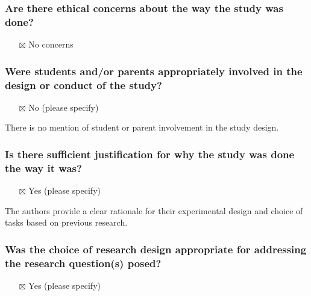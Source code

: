 \documentclass[
  doc, a4paper]{apa7}
\providecommand{\tightlist}{%
  \setlength{\itemsep}{0pt}\setlength{\parskip}{0pt}}
\begin{document}
\subsubsection{Are there ethical concerns about the way the study was done?}\label{are-there-ethical-concerns-about-the-way-the-study-was-done}

\begin{itemize}
\tightlist
\item[$\boxtimes$]
  No concerns
\end{itemize}

\subsubsection{Were students and/or parents appropriately involved in the design or conduct of the study?}\label{were-students-andor-parents-appropriately-involved-in-the-design-or-conduct-of-the-study}

\begin{itemize}
\tightlist
\item[$\boxtimes$]
  No (please specify)
\end{itemize}

There is no mention of student or parent involvement in the study design.

\subsubsection{Is there sufficient justification for why the study was done the way it was?}\label{is-there-sufficient-justification-for-why-the-study-was-done-the-way-it-was}

\begin{itemize}
\tightlist
\item[$\boxtimes$]
  Yes (please specify)
\end{itemize}

The authors provide a clear rationale for their experimental design and choice of tasks based on previous research.

\subsubsection{Was the choice of research design appropriate for addressing the research question(s) posed?}\label{was-the-choice-of-research-design-appropriate-for-addressing-the-research-questions-posed}

\begin{itemize}
\tightlist
\item[$\boxtimes$]
  Yes (please specify)
\end{itemize}
\end{document}
